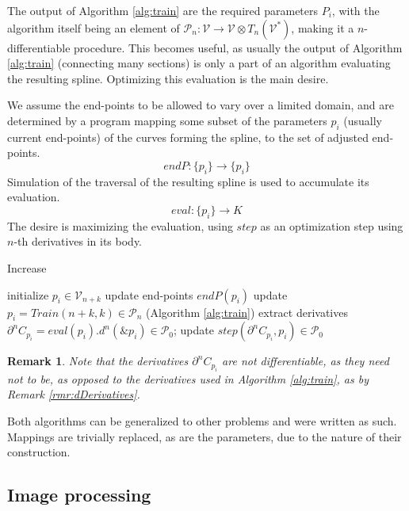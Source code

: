 \documentclass{article}
\newcommand{\VV}{\mathcal{V}}
\newcommand{\dP}{\mathcal{P}}
\newcommand{\D}{\partial}
\newtheorem{opomba}{Remark}[section]
\begin{document}
The output of Algorithm \ref{alg:train} are the required parameters $P_i$, with the algorithm itself being an element of $\dP_{n}:\VV\to\VV\otimes T_{n}(\VV^*)$, making it a $n$-differentiable procedure. This becomes useful, as usually the output of Algorithm \ref{alg:train} (connecting many sections) is only a part of an algorithm evaluating the resulting spline. Optimizing this evaluation is the main desire.

We assume the end-points to be allowed to vary over a limited domain, and are determined by a program mapping some subset of the parameters $p_i$ (usually current end-points) of the curves forming the spline, to the set of adjusted end-points.
\begin{equation}
endP:\{p_i\}\to\{p_i\}
\end{equation}
Simulation of the traversal of the resulting spline is used to accumulate its evaluation.
\begin{equation}
eval:\{p_i\}\to K
\end{equation}
The desire is maximizing the evaluation, using $step$ as an optimization step using $n$-th derivatives in its body.

 \begin{algorithm}[H]
   \caption{Increase}
   \label{alg:Increase}
   \begin{algorithmic}[1]
   \State initialize $p_i\in\VV_{n+k}$
   \State update end-points $endP(p_i)$
   \State update $p_i=Train(n+k,k)\in\dP_{n}$ (Algorithm \ref{alg:train})
   \State extract derivatives $\D^n C_{p_i}=eval(p_i).d^n(\&p_i)\in\dP_{0}$;
   \State update $step(\D^n C_{p_i},p_i)\in\dP_0$
   \EndFor
   \EndProcedure
   \end{algorithmic}
   \end{algorithm}
   \begin{opomba}
   Note that the derivatives $\D^n C_{p_i}$ are not differentiable, as they need not to be, as opposed to the derivatives used in Algorithm \ref{alg:train}, as by Remark \ref{rmr:dDerivatives}.
   \end{opomba}
Both algorithms can be generalized to other problems and were written as such. Mappings are trivially replaced, as are the parameters, due to the nature of their construction.

\subsection{Image processing}
\end{document}
